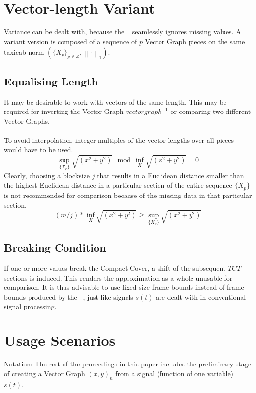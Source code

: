 \documentclass{report}
\newcommand\norm[1]{\left\lVert#1\right\rVert}
\begin{document}
\chapter{Vector-length Variant}
Variance can be dealt with, because the ~\cite[Stopeight\_Analyzer.tex]{Analyzer} seamlessly ignores missing values. A variant version is composed of a sequence of $p$ Vector Graph pieces on the same taxicab norm $(\{X_{p}\}_{p\in \mathbb{Z}},\norm{\cdot}_1)$.
\section{Equalising Length}
It may be desirable to work with vectors of the same length. This may be required for inverting the Vector Graph $vectorgraph^{-1}$ or comparing two different Vector Graphs.\\\\
To avoid interpolation, integer multiples of the vector lengths over all pieces would have to be used.
\begin{equation}
\sup \limits _{\{X_{p}\}} \sqrt{(x^2+y^2)} \mod \inf \limits _{X} \sqrt{(x^2+y^2)} = 0
\end{equation}
Clearly, choosing a blocksize $j$ that results in a Euclidean distance smaller than the highest Euclidean distance in a particular section of the entire sequence $\{X_{p}\}$ is not recommended for comparison because of the missing data in that particular section.
\begin{equation}
(m/j)*\inf \limits _{X} \sqrt{(x^2+y^2)} \geq \sup \limits _{\{X_{p}\}} \sqrt{(x^2+y^2)}\label{eq:4}
\end{equation}
\section{Breaking Condition}
If one or more values break the Compact Cover, a shift of the subsequent $TCT$ sections is induced. This renders the approximation as a whole unusable for comparison. It is thus advisable to use fixed size frame-bounds instead of frame-bounds produced by the ~\cite[Stopeight\_Analyzer.tex]{Analyzer}, just like signals $s(t)$ are dealt with in conventional signal processing.

\chapter{Usage Scenarios}
Notation: The rest of the proceedings in this paper includes the preliminary stage of creating a Vector Graph $(x,y)_{n}$ from a signal (function of one variable) $s(t)$.
\end{document}
